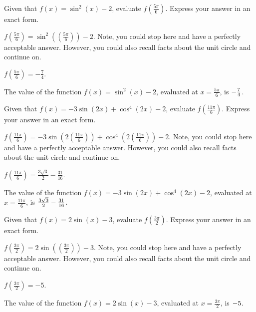 \begin{shuffle}
\begin{exercise}
Given that $f(x)=\sin ^2(x)-2$, evaluate $f(\frac{5 \pi }{6})$. Express your answer in an exact form.
\begin{solution}
\begin{hint}
$f(\frac{5 \pi }{6})=\sin ^2((\frac{5 \pi }{6}))-2$. Note, you could stop here and have a perfectly acceptable answer. However, you could also recall facts about the unit circle and continue on. 
\end{hint}
\begin{hint}
$f(\frac{5 \pi }{6})=-\frac{7}{4}$.
\end{hint}
The value of the function $f(x) = \sin ^2(x)-2$, evaluated at $x=\frac{5 \pi }{6}$, is ${-\frac{7}{4}}$.
\end{solution}
\end{exercise}

\begin{exercise}
Given that $f(x)=-3 \sin (2 x)+\cos ^4(2 x)-2$, evaluate $f(\frac{11 \pi }{6})$. Express your answer in an exact form.
\begin{solution}
\begin{hint}
$f(\frac{11 \pi }{6})=-3 \sin (2 (\frac{11 \pi }{6}))+\cos ^4(2 (\frac{11 \pi }{6}))-2$. Note, you could stop here and have a perfectly acceptable answer. However, you could also recall facts about the unit circle and continue on. 
\end{hint}
\begin{hint}
$f(\frac{11 \pi }{6})=\frac{3 \sqrt{3}}{2}-\frac{31}{16}$.
\end{hint}
The value of the function $f(x) = -3 \sin (2 x)+\cos ^4(2 x)-2$, evaluated at $x=\frac{11 \pi }{6}$, is ${\frac{3 \sqrt{3}}{2}-\frac{31}{16}}$.
\end{solution}
\end{exercise}

\begin{exercise}
Given that $f(x)=2 \sin (x)-3$, evaluate $f(\frac{3 \pi }{2})$. Express your answer in an exact form.
\begin{solution}
\begin{hint}
$f(\frac{3 \pi }{2})=2 \sin ((\frac{3 \pi }{2}))-3$. Note, you could stop here and have a perfectly acceptable answer. However, you could also recall facts about the unit circle and continue on. 
\end{hint}
\begin{hint}
$f(\frac{3 \pi }{2})=-5$.
\end{hint}
The value of the function $f(x) = 2 \sin (x)-3$, evaluated at $x=\frac{3 \pi }{2}$, is ${-5}$.
\end{solution}
\end{exercise}


\end{shuffle}
